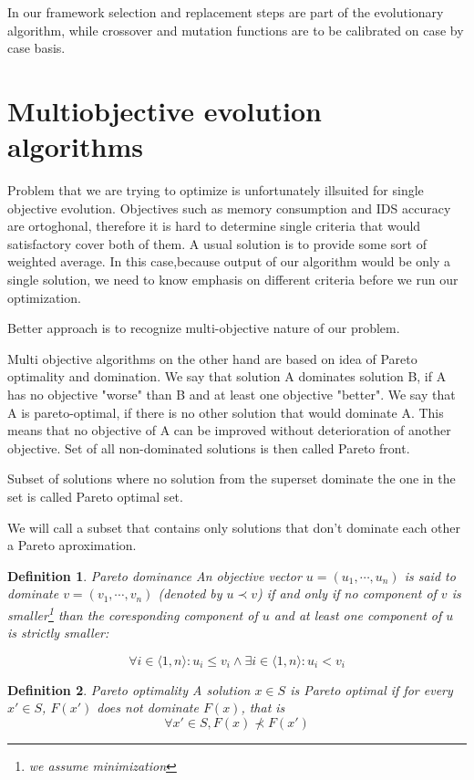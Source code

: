 \documentclass[12pt,oneside,draft]{fithesis2}
\newtheorem{defn}{Definition}
\begin{document}
In our framework selection and replacement steps are part of the evolutionary algorithm, while crossover and mutation functions are to be calibrated on case by case basis.

\section{Multiobjective evolution algorithms}
Problem that we are trying to optimize is unfortunately illsuited for single objective evolution. Objectives such as memory consumption and IDS accuracy are ortoghonal, therefore it is hard to determine single criteria that would satisfactory cover both of them. A usual solution is to provide some sort of weighted average. In this case,because output of our algorithm would be only a single solution, we need to know emphasis on different criteria before we run our optimization. 

Better approach is to recognize multi-objective nature of our problem.

Multi objective algorithms on the other hand are based on idea of Pareto optimality and domination. We say that solution A dominates solution B, if A has no objective "worse" than B and at least one objective "better". We say that A is pareto-optimal, if there is no other solution that would dominate A. This means that no objective of A can be improved without deterioration of another objective. Set of all non-dominated solutions is then called Pareto front. 

Subset of solutions where no solution from the superset dominate the one in the set is called Pareto optimal set.

We will call a subset that contains only solutions that don't dominate each other a Pareto aproximation.

\begin{defn}{Pareto dominance}
An objective vector $u = (u_1,\cdots,u_n)$ is said to dominate $v = (v_1,\cdots,v_n)$ (denoted by $u \prec v$) if and only if no component of $v$ is smaller\footnote{we assume minimization} than the coresponding component of $u$ and at least one component of $u$ is strictly smaller:

$$ \forall i \in \langle 1,n\rangle: u_i \leq v_i \land \exists i \in \langle 1,n\rangle: u_i < v_i $$
\end{defn}

\begin{defn}{Pareto optimality}
A solution $x \in S$ is Pareto optimal if for every $x' \in S$, $F(x')$ does not dominate $F(x)$, that is $$ \forall x' \in S, F(x) \not \prec F(x') $$
\end{defn}
\end{document}
